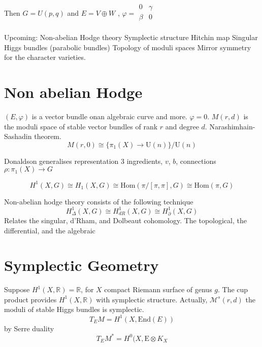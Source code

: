 Then $ G = U(p,q) $ and $ E = V \oplus W $ , $\varphi = \begin{array}{rr}
    0 &  \gamma \\
    \beta & 0 \\
\end{array} $ 

Upcoming:
Non-abelian Hodge theory
Symplectic structure 
Hitchin map 
Singular Higgs bundles (parabolic bundles) 
Topology of moduli spaces 
Mirror symmetry for the character varieties. 

\section{Non abelian Hodge} %

$(E, \varphi) $ is a vector bundle onan algebraic curve and more. 
$\varphi = 0 $. 
$M(r,d) $ is the moduli space of stable vector bundles of rank $r$ and degree $d$.
Narashimhain-Sashadin theorem. 
\begin{equation}
    M ( r, 0  ) \cong \{ \pi_ 1 (X) \rightarrow \mathrm{U}(n)\} / \mathrm{U}(n) 
\end{equation}

Donaldson generalises representation 
3 ingredients, $v$, $b$, connections $ \rho : \pi_1 ( X) \rightarrow  G$ 

\begin{equation}
     H^1 ( X, G) \cong H_1 ( X, G) \cong \mathrm{Hom} ( \pi / [\pi, \pi] , G) \cong \mathrm{Hom} ( \pi, G) 
\end{equation}

Non-abelian hodge theory consists of the following technique
\begin{equation}
    H^1 _{\Delta } (X, G) \cong H^1 _{dR} ( X,G) \cong H^1 _{\partial} ( X,G)  
\end{equation}
Relates the singular, d'Rham, and Dolbeaut cohomology. 
The topological, the differential, and the algebraic

\section{Symplectic Geometry} %

Suppose $ H^1( X, \mathbb{R} ) = \mathbb{R} $, 
for $ X $ compact Riemann surface of genus $g$. 
The cup product provides $H^1( X, \mathbb{R} ) $ with symplectic structure. 
Actually, 
$ \mathcal{M} ^s (r,d) $ the moduli of stable Higgs bundles is symplectic. 
\begin{equation}
    T_E M = H^1( X, \mathrm{End}(E) ) 
\end{equation}
by Serre duality
\begin{equation}
    T_E M ^* = H^0 ( X, \mathrm{E} \otimes K_X 
\end{equation}

